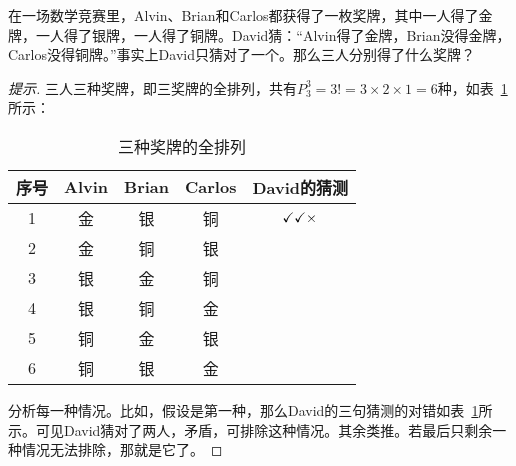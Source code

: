 \begin{example}
  在一场数学竞赛里，Alvin、Brian和Carlos都获得了一枚奖牌，其中一人得了金牌，一人得了银牌，一人得了铜牌。David猜：“Alvin得了金牌，Brian没得金牌，Carlos没得铜牌。”事实上David只猜对了一个。那么三人分别得了什么奖牌？
\end{example}
\begin{proof}[提示]
  三人三种奖牌，即三奖牌的全排列，共有$P_3^3=3!=3\times2\times1=6$种，如表~\ref{tab:permutation-of-medals}所示：
  \begin{table}[htbp]
    \centering
    \caption{三种奖牌的全排列}
    \label{tab:permutation-of-medals}
    \begin{tabular}{ccccc}
      \toprule
      序号 & Alvin & Brian & Carlos & David的猜测\\\midrule
      1    & 金    & 银    & 铜     & $\checkmark\checkmark\times$\\
      2    & 金    & 铜    & 银     &\\
      3    & 银    & 金    & 铜     &\\
      4    & 银    & 铜    & 金     &\\
      5    & 铜    & 金    & 银     &\\
      6    & 铜    & 银    & 金     &\\\bottomrule
    \end{tabular}
  \end{table}

  分析每一种情况。比如，假设是第一种，那么David的三句猜测的对错如表~\ref{tab:permutation-of-medals}所示。可见David猜对了两人，矛盾，可排除这种情况。其余类推。若最后只剩余一种情况无法排除，那就是它了。
\end{proof}


